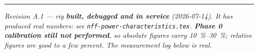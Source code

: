 \documentclass[11pt,a4paper]{article}
\providecommand{\bad}[1]{\textcolor{warn}{\textbf{#1}}}
\begin{document}
\vspace{4mm}
\hrule
\vspace{2mm}
\noindent\small
\textit{Revision A.1 --- rig \textbf{built, debugged and in service} (2026-07-14). It has produced real numbers: see \texttt{nff-power-characteristics.tex}. \bad{Phase 0 calibration still not performed}, so absolute figures carry \SIrange{10}{30}{\percent};
relative figures are good to a few percent. The measurement log below is real.}
\end{document}
